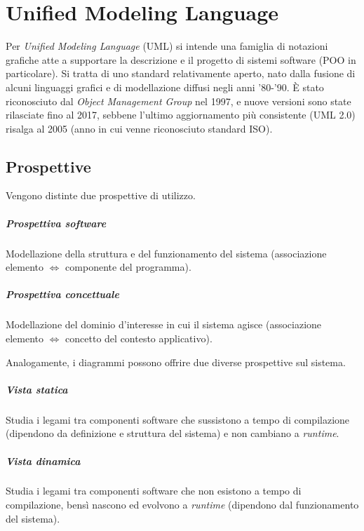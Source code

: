 \chapter{Unified Modeling Language}

Per \textit{Unified Modeling Language} (UML) si intende una famiglia di notazioni grafiche atte a supportare la descrizione e il progetto di sistemi software (POO in particolare). Si tratta di uno standard relativamente aperto, nato dalla fusione di alcuni linguaggi grafici e di modellazione diffusi negli anni '80-'90. È stato riconosciuto dal \textit{Object Management Group} nel 1997, e nuove versioni sono state rilasciate fino al 2017, sebbene l'ultimo aggiornamento più consistente (UML 2.0) risalga al 2005 (anno in cui venne riconosciuto standard ISO).

\section{Prospettive}

Vengono distinte due prospettive di utilizzo.

\paragraph{Prospettiva software} Modellazione della struttura e del funzionamento del sistema (associazione elemento $\Leftrightarrow$ componente del programma).

\paragraph{Prospettiva concettuale} Modellazione del dominio d'interesse in cui il sistema agisce (associazione elemento $\Leftrightarrow$ concetto del contesto applicativo).


Analogamente, i diagrammi possono offrire due diverse prospettive sul sistema.

\paragraph{Vista statica} Studia i legami tra componenti software che sussistono a tempo di compilazione (dipendono da definizione e struttura del sistema) e non cambiano a \textit{runtime}.

\paragraph{Vista dinamica} Studia i legami tra componenti software che non esistono a tempo di compilazione, bensì nascono ed evolvono a \textit{runtime} (dipendono dal funzionamento del sistema).

